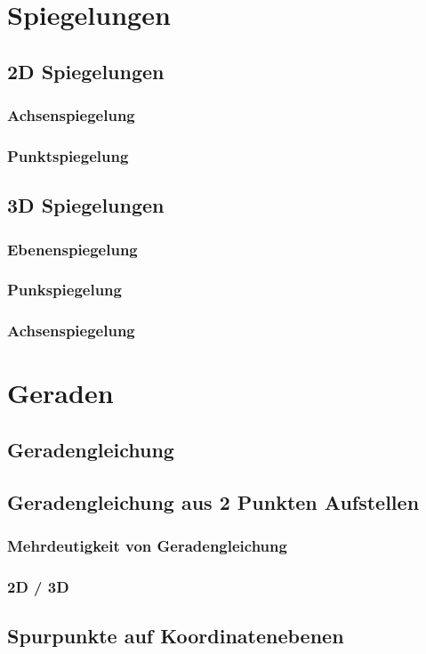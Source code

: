 \section{Spiegelungen}
\subsection{2D Spiegelungen}
\subsubsection{Achsenspiegelung}
\subsubsection{Punktspiegelung}
\subsection{3D Spiegelungen}
\subsubsection{Ebenenspiegelung}
\subsubsection{Punkspiegelung}
\subsubsection{Achsenspiegelung}

\section{Geraden}
\subsection{Geradengleichung}
\subsection{Geradengleichung aus 2 Punkten Aufstellen}
\subsubsection{Mehrdeutigkeit von Geradengleichung}
\subsubsection{2D / 3D}
\subsection{Spurpunkte auf Koordinatenebenen}
